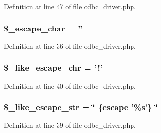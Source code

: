 Definition at line 47 of file odbc\-\_\-driver.\-php.

\hypertarget{class_c_i___d_b__odbc__driver_aaec2fb0112850159063a8e47ad3aed6e}{
\subsubsection[{\$\-\_\-escape\-\_\-char}]{\setlength{\rightskip}{0pt plus 5cm}\$\-\_\-escape\-\_\-char = ''}}\label{class_c_i___d_b__odbc__driver_aaec2fb0112850159063a8e47ad3aed6e}


Definition at line 36 of file odbc\-\_\-driver.\-php.

\hypertarget{class_c_i___d_b__odbc__driver_a668acfd923d0342389cd3a614628cf2a}{
\subsubsection[{\$\-\_\-like\-\_\-escape\-\_\-chr}]{\setlength{\rightskip}{0pt plus 5cm}\$\-\_\-like\-\_\-escape\-\_\-chr = '!'}}\label{class_c_i___d_b__odbc__driver_a668acfd923d0342389cd3a614628cf2a}


Definition at line 40 of file odbc\-\_\-driver.\-php.

\hypertarget{class_c_i___d_b__odbc__driver_adf86ecadf3d0e1ce3f5e0eaeeb3867ae}{
\subsubsection[{\$\-\_\-like\-\_\-escape\-\_\-str}]{\setlength{\rightskip}{0pt plus 5cm}\$\-\_\-like\-\_\-escape\-\_\-str = \char`\"{} \{escape '\%s'\} \char`\"{}}}\label{class_c_i___d_b__odbc__driver_adf86ecadf3d0e1ce3f5e0eaeeb3867ae}


Definition at line 39 of file odbc\-\_\-driver.\-php.

